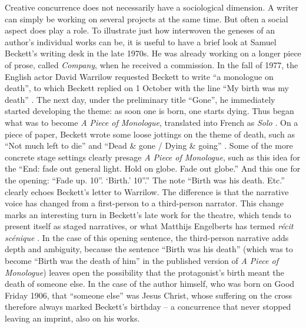 \begin{paper}
Creative concurrence does not necessarily have a sociological dimension.
A writer can simply be working on several projects at the same time. But
often a social aspect does play a role. To illustrate just how
interwoven the geneses of an author's individual works can be, it is
useful to have a brief look at Samuel Beckett's writing desk in the late
1970s. He was already working on a longer piece of prose, called
\emph{Company}, when he received a commission. In the fall of 1977, the
English actor David Warrilow requested Beckett to write ``a monologue on
death'', to which Beckett replied on 1
October with the line ``My birth was my death'' \citep[471 note 1]{beckett_letters_2016}. The next
day, under the preliminary title ``Gone'', he immediately started
developing the theme: as soon one is born, one starts dying. Thus began
what was to become \emph{A Piece of Monologue}, translated into French
as \emph{Solo} \citep[205]{pilling_samuel_2016}. On a piece of paper, Beckett wrote
some loose jottings on the theme of death, such as ``Not much left to
die'' and ``Dead \& gone / Dying \& going'' \citep[UoR MS 2460, m28, 01v; qtd. in][75]{van_hulle_becketts_2019}. Some of the more concrete
stage settings clearly presage \emph{A Piece of Monologue}, such as this
idea for the ``End: fade out general light. Hold on globe. Fade out
globe.'' And this one for the opening: ``Fade up. 10''. `Birth.' 10''.''
\citep[UoR MS 2460, m28, 01v; qtd. in][75]{van_hulle_becketts_2019} The note ``Birth was his death.
Etc.'' clearly echoes Beckett's letter to Warrilow. The difference is
that the narrative voice has changed from a first-person to a
third-person narrator. This change marks an interesting turn in
Beckett's late work for the theatre, which tends to present itself as
staged narratives, or what Matthijs Engelberts has termed \emph{récit
scénique} \citep[211--12]{engelberts_defis_2001}. In the case of this opening
sentence, the third-person narrative adds depth and ambiguity, because
the sentence ``Birth was his death'' (which was to become ``Birth was
the death of him'' in the published version of \emph{A Piece of
Monologue}) leaves open the possibility that the protagonist's birth
meant the death of someone else. In the case of the author himself, who
was born on Good Friday 1906, that ``someone else'' was Jesus Christ,
whose suffering on the cross therefore always marked Beckett's birthday
-- a concurrence that never stopped leaving an imprint, also on his
works.


\end{paper}
